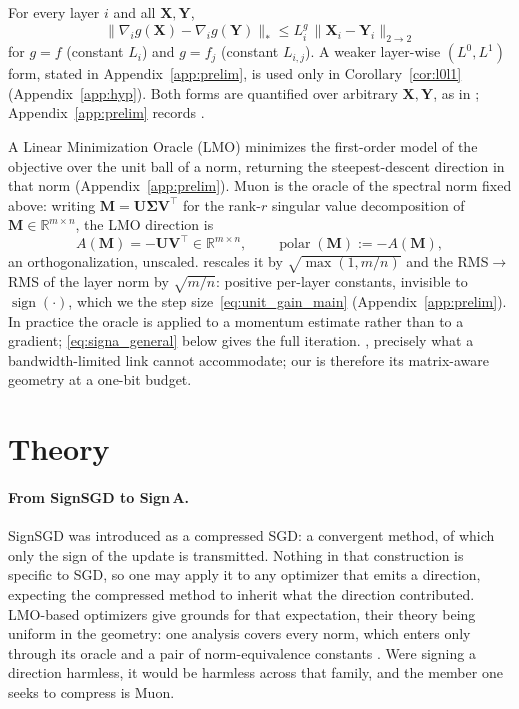 \begin{assumption}\label{as:2}
For every layer $i$ and all $\mathbf{X},\mathbf{Y}$,
\begin{equation}
\|\nabla_i g(\mathbf{X}) - \nabla_i g(\mathbf{Y})\|_{*} \le L_i^{g}\,\|\mathbf{X}_i - \mathbf{Y}_i\|_{2\to 2}
\end{equation}
for $g = f$ (constant $L_i$) and $g = f_j$ (constant $L_{i,j}$). A weaker layer-wise $(L^0,L^1)$ form, stated in Appendix~\ref{app:prelim}, is used only in Corollary~\ref{cor:l0l1} (Appendix~\ref{app:hyp}). Both forms are quantified over arbitrary $\mathbf{X},\mathbf{Y}$, as in \citet{gruntkowska2025error}; Appendix~\ref{app:prelim} records .
\end{assumption}

A Linear Minimization Oracle (LMO) minimizes the first-order model of the objective over the unit ball of a norm, returning the steepest-descent direction in that norm (Appendix~\ref{app:prelim}). Muon is the oracle of the spectral norm fixed above: writing $\mathbf{M}=\mathbf{U}\boldsymbol{\Sigma}\mathbf{V}^\top$ for the rank-$r$ singular value decomposition of $\mathbf{M}\in\mathbb{R}^{m\times n}$, the LMO direction is
\begin{equation}
A(\mathbf{M})=-\mathbf{U}\mathbf{V}^\top \in \mathbb{R}^{m\times n},
\qquad \operatorname{polar}(\mathbf{M}):=-A(\mathbf{M}),
\end{equation}
an orthogonalization, unscaled.  rescales it by $\sqrt{\max(1,m/n)}$ \citep{jordan2024muon} and the RMS$\to$RMS  of the layer norm by $\sqrt{m/n}$: positive per-layer constants, invisible to $\operatorname{sign}(\cdot)$, which we  the step size~\eqref{eq:unit_gain_main} (Appendix~\ref{app:prelim}). In practice the oracle is applied to a momentum estimate rather than to a gradient; \eqref{eq:signa_general} below gives the full iteration. , precisely what a bandwidth-limited link cannot accommodate; our  is therefore its matrix-aware geometry at a one-bit budget.


\section{Theory}\label{sec:theory}
\paragraph{From SignSGD to Sign\,A.} SignSGD was introduced as a compressed SGD: a convergent method, of which only the sign of the update is transmitted. Nothing in that construction is specific to SGD, so one may apply it to any optimizer that emits a direction, expecting the compressed method to inherit what the direction contributed. LMO-based optimizers give grounds for that expectation, their theory being uniform in the geometry: one analysis covers every norm, which enters only through its oracle and a pair of norm-equivalence constants \citep{pethick2025training,kovalev2025understanding,riabinin2025gluon}. Were signing a direction harmless, it would be harmless across that family, and the member one seeks to compress is Muon.


